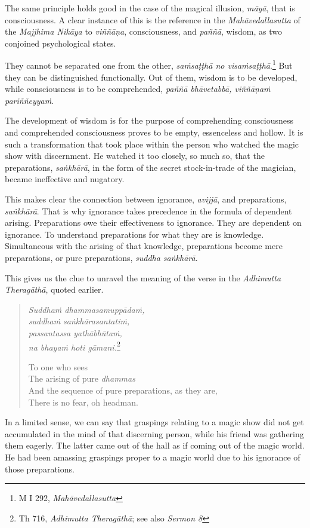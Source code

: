 The same principle holds good in the case of the magical illusion, \emph{māyā}, that is consciousness. A clear instance of this is the reference in the \emph{Mahāvedallasutta} of the \emph{Majjhima Nikāya} to \emph{viññāṇa}, consciousness, and \emph{paññā}, wisdom, as two conjoined psychological states.

They cannot be separated one from the other, \emph{saṁsaṭṭhā no visaṁsaṭṭhā}.\footnote{M I 292, \emph{Mahāvedallasutta}} But they can be distinguished functionally. Out of them, wisdom is to be developed, while consciousness is to be comprehended, \emph{paññā bhāvetabbā, viññāṇaṁ pariññeyyaṁ}.

The development of wisdom is for the purpose of comprehending consciousness and comprehended consciousness proves to be empty, essenceless and hollow. It is such a transformation that took place within the person who watched the magic show with discernment. He watched it too closely, so much so, that the preparations, \emph{saṅkhārā}, in the form of the secret stock-in-trade of the magician, became ineffective and nugatory.

This makes clear the connection between ignorance, \emph{avijjā}, and preparations, \emph{saṅkhārā}. That is why ignorance takes precedence in the formula of dependent arising. Preparations owe their effectiveness to ignorance. They are dependent on ignorance. To understand preparations for what they are is knowledge. Simultaneous with the arising of that knowledge, preparations become mere preparations, or pure preparations, \emph{suddha saṅkhārā}.

This gives us the clue to unravel the meaning of the verse in the \emph{Adhimutta Theragāthā}, quoted earlier.

\begin{quote}
\emph{Suddhaṁ dhammasamuppādaṁ,}\\
\emph{suddhaṁ saṅkhārasantatiṁ,}\\
\emph{passantassa yathābhūtaṁ,}\\
\emph{na bhayaṁ hoti gāmani.}\footnote{Th 716, \emph{Adhimutta Theragāthā}; see also \emph{Sermon 8}}

To one who sees\\
The arising of pure \emph{dhammas}\\
And the sequence of pure preparations, as they are,\\
There is no fear, oh headman.
\end{quote}

In a limited sense, we can say that graspings relating to a magic show did not get accumulated in the mind of that discerning person, while his friend was gathering them eagerly. The latter came out of the hall as if coming out of the magic world. He had been amassing graspings proper to a magic world due to his ignorance of those preparations.

